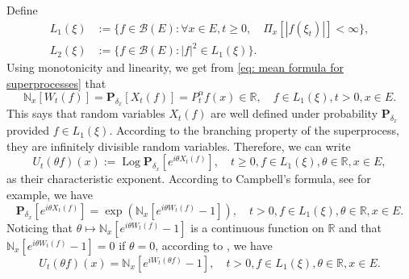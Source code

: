 \documentclass[12pt,a4paper]{amsart}
\theoremstyle{plain}
\theoremstyle{definition}
\numberwithin{equation}{section}
\begin{document}
    Define
\begin{equation}\begin{split}
    L_1(\xi)
    &:= \{f\in \mathcal B(E): \forall x\in E, t\geq 0, \quad \Pi_x[|f(\xi_t)|]< \infty\},
    \\L_2(\xi)
    &:= \{f \in \mathcal B(E): |f|^2 \in L_1(\xi)\}.
\end{split}\end{equation}
    Using monotonicity and linearity, we get from \eqref{eq: mean formula for superprocesses}  that
\begin{equation}
    \mathbb N_x[W_t(f)]
    =\mathbf P_{\delta_x}[X_t(f)]=P^\alpha_t f(x) \in \mathbb R,
    \quad f\in L_1(\xi), t > 0,x\in E.
\end{equation}
    This says that random variables $X_t(f)$ are well defined under probability $\mathbf P_{\delta_x}$ provided $f\in L_1(\xi)$.
    According to the branching property of the superprocess, they are infinitely divisible random variables.
    Therefore, we can write
\[
    U_t(\theta f)(x) := \operatorname{Log} \mathbf P_{\delta_x}[e^{i \theta X_t(f)}],
    \quad t\geq 0, f\in L_1(\xi), \theta \in \mathbb R, x\in E,
\]
    as their characteristic exponent.
    According to Campbell's formula, see \cite[Theorem 2.7]{Kyprianou2014Fluctuations} for example, we have
\[
    \mathbf P_{\delta_x} [e^{i\theta X_t(f)}]
    = \exp(\mathbb N_x[ e^{i\theta W_t(f)} - 1]),
    \quad t>0, f\in L_1(\xi), \theta \in \mathbb R, x\in E.
\]
    Noticing that $\theta \mapsto \mathbb N_x[e^{i\theta W_t(f)} - 1]$ is a continuous function on $\mathbb R$ and that $\mathbb N_x[e^{i\theta W_t(f)} - 1] = 0$ if $\theta = 0$, according to \cite[Lemma 7.6]{Sato1999Levy}, we have
\begin{equation}
\label{eq: N and characteristic exponent}
    U_t(\theta f)(x) = \mathbb N_x[e^{i W_t(\theta f)} - 1],
    \quad t>0, f\in L_1(\xi), \theta \in \mathbb R, x\in E.
\end{equation}
\end{document}

